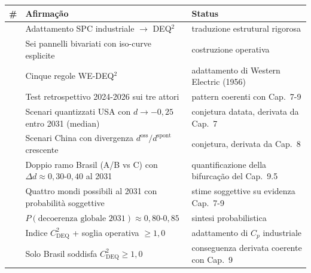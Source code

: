 {\def\LTcaptype{none} %
{\small\begin{longtable}[]{@{}
  >{\raggedright\arraybackslash}p{}
  >{\raggedright\arraybackslash}p{}
  >{\raggedright\arraybackslash}p{}@{}}
\toprule\noalign{}
\begin{minipage}[b]{\linewidth}\raggedright
\#
\end{minipage} & \begin{minipage}[b]{\linewidth}\raggedright
Afirmação
\end{minipage} & \begin{minipage}[b]{\linewidth}\raggedright
Status
\end{minipage} \\
\midrule\noalign{}
\endhead
\bottomrule\noalign{}
\endlastfoot
1 & Adattamento SPC industriale $\to$ DEQ$^2$ & \Hypoth{} traduzione
estrutural rigorosa \\
2 & Sei pannelli bivariati con iso-curve esplicite & \Hypoth{}
costruzione operativa \\
3 & Cinque regole WE-DEQ$^2$ & \Hypoth{} adattamento di Western Electric
(1956) \\
4 & Test retrospettivo 2024-2026 sui tre attori & \Proved{} pattern
coerenti con Cap.~7-9 \\
5 & Scenari quantizzati USA con \(d \to -0{,}25\) entro 2031 (median) &
\Conj{} conjetura datata, derivata da Cap.~7 \\
6 & Scenari China con divergenza \(d^{\text{oss}}/d^{\text{spont}}\)
crescente & \Conj{} conjetura, derivata da Cap.~8 \\
7 & Doppio ramo Brasil (A/B vs C) con
\(\Delta d \approx 0{,}30\)-\(0{,}40\) al 2031 & \Conj{} quantificazione
della bifurcação del Cap.~9.5 \\
8 & Quattro mondi possibili al 2031 con probabilità soggettive & \Conj{}
stime soggettive su evidenza Cap.~7-9 \\
9 & \(P(\text{decoerenza globale 2031}) \approx 0{,}80\)-\(0{,}85\) &
\Conj{} sintesi probabilistica \\
10 & Indice \(C_{\text{DEQ}}^2\) + soglia operativa \(\geq 1{,}0\) &
\Hypoth{} adattamento di \(C_p\) industriale \\
11 & Solo Brasil soddisfa \(C_{\text{DEQ}}^2 \geq 1{,}0\) & \Hypoth{}
conseguenza derivata coerente con Cap.~9 \\
\end{longtable}}
}


